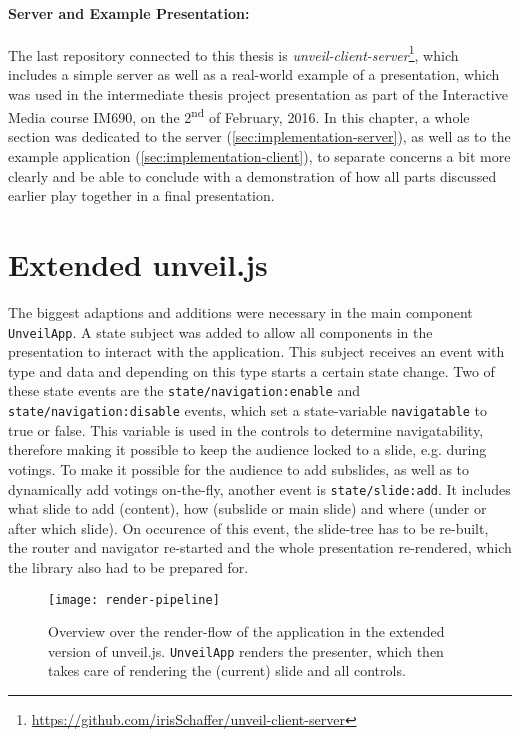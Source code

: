 \paragraph{Server and Example Presentation:} The last repository connected to this thesis is \emph{unveil-client-server}\footnote{\url{https://github.com/irisSchaffer/unveil-client-server}}, which includes a simple server as well as a real-world example of a presentation, which was used in the intermediate thesis project presentation as part of the Interactive Media course IM690, on the 2\textsuperscript{nd}\xspace of February, 2016. In this chapter, a whole section was dedicated to the server (\ref{sec:implementation-server}), as well as to the example application (\ref{sec:implementation-client}), to separate concerns a bit more clearly and be able to conclude with a demonstration of how all parts discussed earlier play together in a final presentation.

\section{Extended unveil.js}
\label{sec:implementation-unveil}
The biggest adaptions and additions were necessary in the main component \texttt{UnveilApp}. A state subject was added to allow all components in the presentation to interact with the application. This subject receives an event with type and data and depending on this type starts a certain state change. Two of these state events are the \texttt{state/navigation:enable} and \texttt{state/navigation:disable} events, which set a state-variable \texttt{navigatable} to true or false. This variable is used in the controls to determine navigatability, therefore making it possible to keep the audience locked to a slide, e.g. during votings.
To make it possible for the audience to add subslides, as well as to dynamically add votings on-the-fly, another event is \texttt{state/slide:add}. It includes what slide to add (content), how (subslide or main slide) and where (under or after which slide). On occurence of this event, the slide-tree has to be re-built, the router and navigator re-started and the whole presentation re-rendered, which the library also had to be prepared for.

\begin{figure}
\centering
\texttt{[image: render-pipeline]}
\caption{Overview over the render-flow of the application in the extended version of unveil.js. \texttt{UnveilApp} renders the presenter, which then takes care of rendering the (current) slide and all controls.}
\label{fig:implementation-unveil-render-pipeline}
\end{figure}

